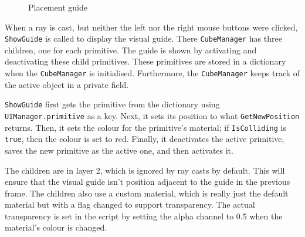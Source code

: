 \documentclass[a4paper, 12pt]{scrartcl}
\begin{document}
\begin{figure}[htp]
  \centering
  \qquad
  \qquad
  \caption{Placement guide}
\end{figure}

When a ray is cast, but neither the left nor the right mouse buttons were clicked, \texttt{ShowGuide} is called to display the visual guide. There \texttt{CubeManager} has three children, one for each primitive. The guide is shown by activating and deactivating these child primitives. These primitives are stored in a dictionary when the \texttt{CubeManager} is initialised. Furthermore, the \texttt{CubeManager} keeps track of the active object in a private field.

\texttt{ShowGuide} first gets the primitive from the dictionary using \texttt{UIManager.primitive} as a key. Next, it sets its position to what \texttt{GetNewPosition} returns. Then, it sets the colour for the primitive's material; if \texttt{IsColliding} is \texttt{true}, then the colour is set to red. Finally, it deactivates the active primitive, saves the new primitive as the active one, and then activates it.

The children are in layer 2, which is ignored by ray casts by default. This will ensure that the visual guide isn't position adjacent to the guide in the previous frame. The children also use a custom material, which is really just the default material but with a flag changed to support transparency. The actual transparency is set in the script by setting the alpha channel to 0.5 when the material's colour is changed.
\end{document}

